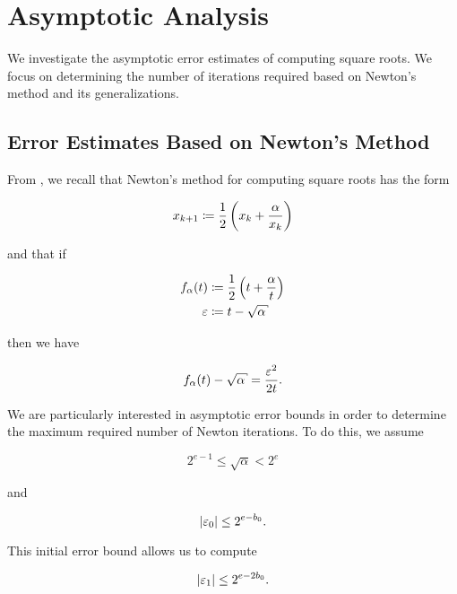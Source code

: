 \section{Asymptotic Analysis}
\label{app:asymptotics}

We investigate the asymptotic error estimates
of computing square roots.
We focus on determining the number of iterations required
based on Newton's method and its generalizations.


\subsection{Error Estimates Based on Newton's Method}
\label{app_asymptotics:error_newton}

From \cite[Chapter 3, Exercise 16]{BabyRudin},
we recall that Newton's method for computing square roots
has the form

\begin{equation}
    x_{k+1} \coloneqq{} \frac{1}{2}\left( x_{k} + \frac{\alpha}{x_{k}} \right)
\end{equation}

\noindent
and that if

\begin{align}
    f_{\alpha}(t) &\algAssign{} \frac{1}{2}\parens{t + \frac{\alpha}{t}}
        \nonumber\\
    \eps &\algAssign{} t - \sqrt{\alpha}
\end{align}

\noindent
then we have

\begin{equation}
    f_{\alpha}(t) - \sqrt{\alpha} = \frac{\eps^{2}}{2t}.
\end{equation}

We are particularly interested in asymptotic error bounds
in order to determine the maximum required number of Newton iterations.
To do this, we assume

\begin{equation}
    2^{e-1} \le \sqrt{\alpha} < 2^{e}
\end{equation}

\noindent
and

\begin{equation}
    \left| \varepsilon_{0} \right| \le 2^{e-b_{0}}.
\end{equation}

\noindent
This initial error bound allows us to compute

\begin{equation}
    \left| \varepsilon_{1} \right| \le 2^{e-2b_{0}}.
\end{equation}

